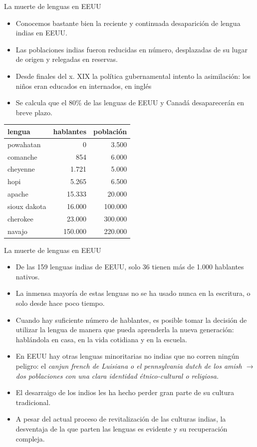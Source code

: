 \documentclass[handout]{beamer}
\begin{document}
\begin{frame}{La muerte de lenguas en EEUU}
\begin{itemize}
	\item Conocemos bastante bien la reciente y continuada desaparición de lengua indias en EEUU.
	\item Las poblaciones indias fueron reducidas en número, desplazadas de su lugar de origen y relegadas en reservas.
	\item Desde finales del x. XIX la política gubernamental intento la asimilación: los niños eran educados en internados, en inglés
	\item Se calcula que el 80\% de las lenguas de EEUU y Canadá desaparecerán en breve plazo.
\end{itemize}

\begin{center}
\begin{footnotesize}
\begin{tabular}{ l r r }
\textbf{lengua} & \textbf{hablantes} & \textbf{población} \\
\hline
powahatan & 0 & 3.500 \\
comanche & 854 & 6.000 \\
cheyenne & 1.721 & 5.000 \\
hopi & 5.265 & 6.500\\
apache & 15.333 & 20.000\\
sioux dakota & 16.000 & 100.000\\
cherokee & 23.000 & 300.000 \\
navajo & 150.000 & 220.000 \\
\end{tabular}
\end{footnotesize}
\end{center}

\end{frame}

\begin{frame}{La muerte de lenguas en EEUU}
\begin{itemize}
	\item De las 159 lenguas indias de EEUU, solo 36 tienen más de 1.000 hablantes nativos.
	\item La inmensa mayoría de estas lenguas no se ha usado nunca en la escritura, o solo desde hace poco tiempo.
	\item Cuando hay suficiente número de hablantes, es posible tomar la decisión de utilizar la lengua de manera que pueda aprenderla la nueva generación: hablándola en casa, en la vida cotidiana y en la escuela.
	\item En EEUU hay otras lenguas minoritarias no indias que no corren ningún peligro: el \it{canjun french} de Luisiana o el \it{pennsylvania dutch} de los amish $\rightarrow$ dos poblaciones con una clara identidad étnico-cultural o religiosa.
	\item El desarraigo de los indios les ha hecho perder gran parte de su cultura tradicional.
	\item A pesar del actual proceso de revitalización de las culturas indias, la desventaja de la que parten las lenguas es evidente y su recuperación compleja.
\end{itemize}
\end{frame} 
\end{document}
